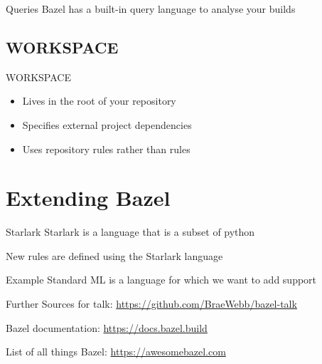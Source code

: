 \documentclass[aspectratio=169]{beamer}
\begin{document}
\begin{body-slide}{Queries}
Bazel has a built-in query language to analyse your builds
\end{body-slide}

\subsection{WORKSPACE}

\begin{body-slide}{WORKSPACE}
\begin{itemize}[<+-|alert@+>]
    \color{UQCSBlue}
    \item Lives in the root of your repository
    \item Specifies external project dependencies
    \item Uses repository rules rather than rules
\end{itemize}
\end{body-slide}


\section{Extending Bazel}

\begin{body-slide}{Starlark}
Starlark is a language that is a subset of python

New rules are defined using the Starlark language
\end{body-slide}

\begin{body-slide}{Example}
Standard ML is a language for which we want to add support
\end{body-slide}

\begin{body-slide}{Further}
Sources for talk: \url{https://github.com/BraeWebb/bazel-talk}

Bazel documentation: \url{https://docs.bazel.build}

List of all things Bazel: \url{https://awesomebazel.com}
\end{body-slide}
\end{document}
